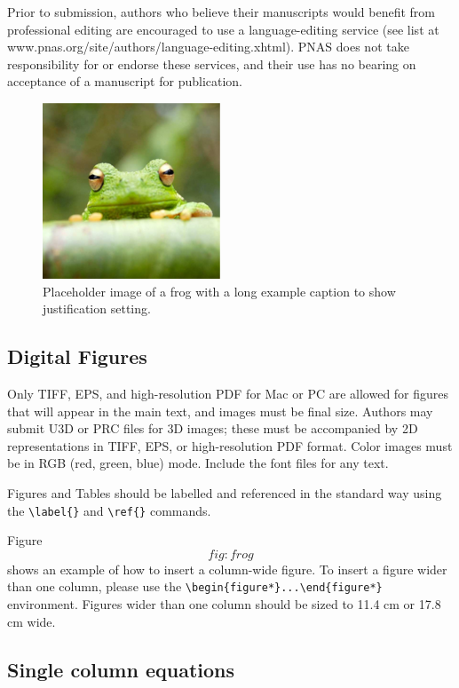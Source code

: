 \documentclass[9pt,twocolumn,twoside,]{pnas-new}
\begin{document}
Prior to submission, authors who believe their manuscripts would benefit
from professional editing are encouraged to use a language-editing
service (see list at www.pnas.org/site/authors/language-editing.xhtml).
PNAS does not take responsibility for or endorse these services, and
their use has no bearing on acceptance of a manuscript for publication.

\begin{figure}
\centering
\includegraphics{frog.png}
\caption{Placeholder image of a frog with a long example caption to show
justification setting.{}}
\end{figure}

\subsection*{Digital Figures}\label{sec:figures}

Only TIFF, EPS, and high-resolution PDF for Mac or PC are allowed for
figures that will appear in the main text, and images must be final
size. Authors may submit U3D or PRC files for 3D images; these must be
accompanied by 2D representations in TIFF, EPS, or high-resolution PDF
format. Color images must be in RGB (red, green, blue) mode. Include the
font files for any text.

Figures and Tables should be labelled and referenced in the standard way
using the \texttt{\textbackslash{}label\{\}} and
\texttt{\textbackslash{}ref\{\}} commands.

Figure \[fig:frog\] shows an example of how to insert a column-wide
figure. To insert a figure wider than one column, please use the
\texttt{\textbackslash{}begin\{figure*\}...\textbackslash{}end\{figure*\}}
environment. Figures wider than one column should be sized to 11.4 cm or
17.8 cm wide.

\subsection*{Single column equations}\label{single-column-equations}
\end{document}
